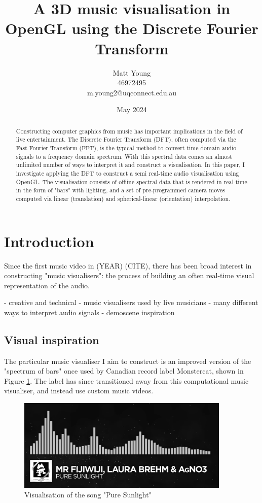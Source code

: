 \documentclass[11pt]{article}
\title{\textbf{A 3D music visualisation in OpenGL using the Discrete Fourier Transform}}
\author{Matt Young \\ 46972495 \\ m.young2@uqconnect.edu.au}
\date{May 2024}
\begin{document}
\maketitle

\begin{abstract}
    Constructing computer graphics from music has important implications in the field of live entertainment.
    The Discrete Fourier Transform (DFT), often computed via the Fast Fourier Transform (FFT), is the typical
    method to convert time domain audio signals to a frequency domain spectrum. With this spectral data comes
    an almost unlimited number of ways to interpret it and construct a visualisation. In this paper, I
    investigate applying the DFT to construct a semi real-time audio visualisation using OpenGL. The
    visualisation consists of offline spectral data that is rendered in real-time in the form of "bars" with
    lighting, and a set of pre-programmed camera moves computed via linear (translation) and
    spherical-linear (orientation) interpolation.
\end{abstract}

\tableofcontents

\clearpage
\listoffigures
\clearpage

\section{Introduction}
Since the first music video in (YEAR) (CITE), there has been broad interest in constructing "music
visualisers": the process of building an often real-time visual representation of the audio.

- creative and technical
- music visualisers used by live musicians
- many different ways to interpret audio signals
- demoscene inspiration

\subsection{Visual inspiration}
The particular music visualiser I aim to construct is an improved version of the "spectrum of bars" once used
by Canadian record label Monstercat, shown in Figure \ref{monstercat}.
The label has since transitioned away
from this computational music visualiser, and instead use custom music videos.

\begin{figure}[H]
\centering
\includegraphics[width=384px]{img/monstercat.png}
\caption{Visualisation of the song "Pure Sunlight" \cite{youtubeElectronicFijiWiji}}
\label{monstercat}
\end{figure}
\end{document}
